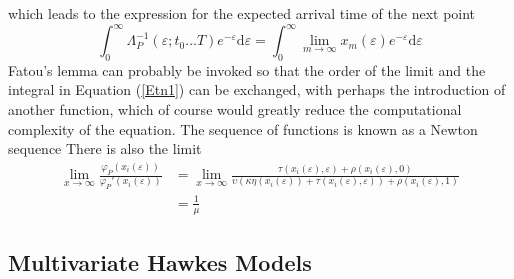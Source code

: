 \documentclass{amsart}
\newcommand{\mathd}{\mathrm{d}}
\begin{document}
which leads to the expression for the expected arrival time of the next point
\begin{equation}
  \int_0^{\infty} \Lambda_P^{- 1} ( \varepsilon ; t_0 \ldots T) e^{-
  \varepsilon} \mathd \varepsilon = \int_0^{\infty} \lim_{m \rightarrow
  \infty} x_m ( \varepsilon) e^{- \varepsilon} \mathd \varepsilon \label{Etn1}
\end{equation}
Fatou's lemma can probably be invoked so that the order of the limit and the
integral in Equation (\ref{Etn1}) can be exchanged, with perhaps the
introduction of another function, which of course would greatly reduce the
computational complexity of the equation. The sequence of functions is known
as a Newton sequence {\cite[3.3p118]{RandomIntegralEquations}} There is also
the limit
\begin{equation}
  \begin{array}{ll}
    \lim_{x \rightarrow \infty} \frac{\varphi_P ( x_i (
    \varepsilon))}{\varphi_P' ( x_i ( \varepsilon))} & = \lim_{x \rightarrow
    \infty} \frac{\tau ( x_i ( \varepsilon), \varepsilon) + \rho ( x_i (
    \varepsilon), 0)}{\upsilon ( \kappa \eta ( x_i ( \varepsilon)) + \tau (
    x_i ( \varepsilon), \varepsilon)) + \rho ( x_i ( \varepsilon), 1)}\\
    & = \frac{1}{\mu}
  \end{array}
\end{equation}

\subsection{Multivariate Hawkes Models}
\end{document}

